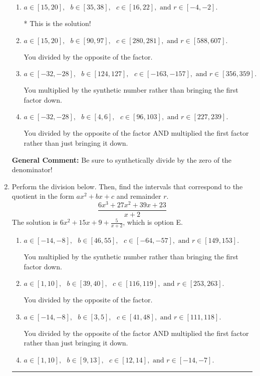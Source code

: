 \documentclass{extbook}[14pt]
\newcommand{\litem}[1]{\item #1

\rule{\textwidth}{0.4pt}}
\begin{document}
\begin{enumerate}
{\begin{enumerate}[label=\Alph*.]
 You multiplied by the synthetic number and subtracted rather than adding during synthetic division.
\item \( a \in [15, 20], \text{   } b \in [35, 38], \text{   } c \in [16, 22], \text{   and   } r \in [-4, -2]. \)

* This is the solution!
\item \( a \in [15, 20], \text{   } b \in [90, 97], \text{   } c \in [280, 281], \text{   and   } r \in [588, 607]. \)

 You divided by the opposite of the factor.
\item \( a \in [-32, -28], \text{   } b \in [124, 127], \text{   } c \in [-163, -157], \text{   and   } r \in [356, 359]. \)

 You multiplied by the synthetic number rather than bringing the first factor down.
\item \( a \in [-32, -28], \text{   } b \in [4, 6], \text{   } c \in [96, 103], \text{   and   } r \in [227, 239]. \)

 You divided by the opposite of the factor AND multiplied the first factor rather than just bringing it down.
\end{enumerate}

\textbf{General Comment:} Be sure to synthetically divide by the zero of the denominator!
}
\litem{
Perform the division below. Then, find the intervals that correspond to the quotient in the form $ax^2+bx+c$ and remainder $r$.
\[ \frac{6x^{3} +27 x^{2} +39 x + 23}{x + 2} \]The solution is \( 6x^{2} +15 x + 9 + \frac{5}{x + 2} \), which is option E.\begin{enumerate}[label=\Alph*.]
\item \( a \in [-14, -8], \text{   } b \in [46, 55], \text{   } c \in [-64, -57], \text{   and   } r \in [149, 153]. \)

 You multiplied by the synthetic number rather than bringing the first factor down.
\item \( a \in [1, 10], \text{   } b \in [39, 40], \text{   } c \in [116, 119], \text{   and   } r \in [253, 263]. \)

 You divided by the opposite of the factor.
\item \( a \in [-14, -8], \text{   } b \in [3, 5], \text{   } c \in [41, 48], \text{   and   } r \in [111, 118]. \)

 You divided by the opposite of the factor AND multiplied the first factor rather than just bringing it down.
\item \( a \in [1, 10], \text{   } b \in [9, 13], \text{   } c \in [12, 14], \text{   and   } r \in [-14, -7]. \)


\end{enumerate}}
\end{enumerate}
\end{document}
